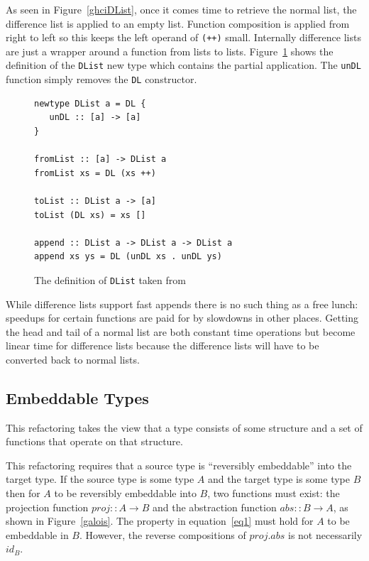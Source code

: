As seen in Figure~\ref{ghciDList}, once it comes time to retrieve the normal list, the difference list is applied to an empty list. Function composition is applied from right to left so this keeps the left operand of \texttt{(++)} small. Internally difference lists are just a wrapper around a function from lists to lists. Figure~\ref{dlistDef} shows the definition of the \texttt{DList} new type which contains the partial application. The \texttt{unDL} function simply removes the \texttt{DL} constructor. 

\begin{figure}[t]
\begin{lstlisting}
newtype DList a = DL {
   unDL :: [a] -> [a]
}

fromList :: [a] -> DList a
fromList xs = DL (xs ++)

toList :: DList a -> [a]
toList (DL xs) = xs []

append :: DList a -> DList a -> DList a
append xs ys = DL (unDL xs . unDL ys)
\end{lstlisting}
\caption{The definition of \texttt{DList} taken from~\citep{realWorldHaskell}}
\label{dlistDef}
\end{figure}

While difference lists support fast appends there is no such thing as a free lunch: speedups for certain functions are paid for by slowdowns in other places. Getting the head and tail of a normal list are both constant time operations but become linear time for difference lists because the difference lists will have to be converted back to normal lists. 


\subsection{Embeddable Types} 
This refactoring takes the view that a type consists of some structure and a set of functions that operate on that structure. 

This refactoring requires that a source type is ``reversibly embeddable'' into the target type. If the source type is some type $A$ and the target type is some type $B$ then for $A$ to be reversibly embeddable into $B$, two functions must exist: the projection function $proj :: A \rightarrow B$ and the abstraction function $abs :: B \rightarrow A$, as shown in Figure~\ref{galois}. The property in equation~\ref{eq1} must hold for $A$ to be embeddable in $B$. However, the reverse compositions of $proj . abs$ is not necessarily $id_B$.   

